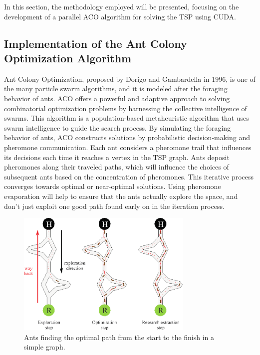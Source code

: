 \documentclass[11pt]{report}
\begin{document}
        In this section, the methodology employed will be presented, focusing on the development of a parallel ACO algorithm for solving the TSP using CUDA.

        \subsection{Implementation of the Ant Colony Optimization Algorithm}
            Ant Colony Optimization, proposed by Dorigo and Gambardella in 1996\cite{dorigo1996ant}, is one of the many particle swarm algorithms, and it is modeled after the foraging behavior of ants. ACO offers a powerful and adaptive approach to solving combinatorial optimization problems by harnessing the collective intelligence of swarms. This algorithm is a population-based metaheuristic algorithm that uses swarm intelligence to guide the search process. By simulating the foraging behavior of ants, ACO constructs solutions by probabilistic decision-making and pheromone communication. Each ant considers a pheromone trail that influences its decisions each time it reaches a vertex in the TSP graph. Ants deposit pheromones along their traveled paths, which will influence the choices of subsequent ants based on the concentration of pheromones. This iterative process converges towards optimal or near-optimal solutions. Using pheromone evaporation will help to ensure that the ants actually explore the space, and don't just exploit one good path found early on in the iteration process. 

            \begin{figure}[h!]
                \centering
                \includegraphics[width=0.75\textwidth,keepaspectratio]{Images/aco.jpg}
                \caption{Ants finding the optimal path from the start to the finish in a simple graph.}
                \label{fig:ant}
            \end{figure}            
    
\end{document}
